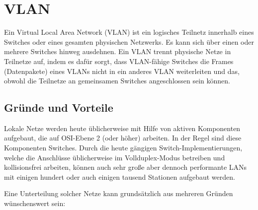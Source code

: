 \section{VLAN}
Ein Virtual Local Area Network (VLAN) ist ein logisches Teilnetz innerhalb eines Switches oder eines gesamten physischen Netzwerks. Es kann sich über einen oder mehrere Switches hinweg ausdehnen. Ein VLAN trennt physische Netze in Teilnetze auf, indem es dafür sorgt, dass VLAN-fähige Switches die Frames (Datenpakete) eines VLANs nicht in ein anderes VLAN weiterleiten und das, obwohl die Teilnetze an gemeinsamen Switches angeschlossen sein können.

\subsection{Gründe und Vorteile}
Lokale Netze werden heute üblicherweise mit Hilfe von aktiven Komponenten aufgebaut, die auf OSI-Ebene 2 (oder höher) arbeiten. In der Regel sind diese Komponenten Switches. Durch die heute gängigen Switch-Implementierungen, welche die Anschlüsse üblicherweise im Vollduplex-Modus betreiben und kollisionsfrei arbeiten, können auch sehr große aber dennoch performante LANs mit einigen hundert oder auch einigen tausend Stationen aufgebaut werden.

Eine Unterteilung solcher Netze kann grundsätzlich aus mehreren Gründen wünschenswert sein:


